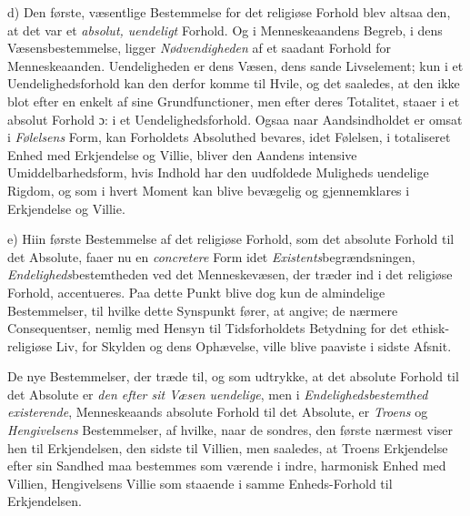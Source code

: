 d) Den første, væsentlige Bestemmelse for det religiøse Forhold blev altsaa
den, at det var et \emph{absolut, uendeligt} Forhold. Og i Menneskeaandens
Begreb, i dens Væsensbestemmelse, ligger \emph{Nødvendigheden} af et saadant
Forhold for Menneskeaanden. Uendeligheden er dens Væsen, dens sande
Livselement; kun i et Uendelighedsforhold kan den derfor komme til Hvile, og
det saaledes, at den ikke blot efter en enkelt af sine Grundfunctioner, men
efter deres Totalitet, staaer i et absolut Forhold ɔ: i et
Uendelighedsforhold. Ogsaa naar Aandsindholdet er omsat i \emph{Følelsens}
Form, kan Forholdets Absoluthed bevares, idet Følelsen, i totaliseret Enhed
med Erkjendelse og Villie, bliver den Aandens intensive Umiddelbarhedsform,
hvis Indhold har den uudfoldede Muligheds uendelige Rigdom, og som i hvert
 Moment kan blive bevægelig og gjennemklares i Erkjendelse og Villie.

e) Hiin første Bestemmelse af det religiøse Forhold, som det absolute Forhold
til det Absolute, faaer nu en \emph{concretere} Form idet
\emph{Existents}begrændsningen, \emph{Endeligheds}bestemtheden ved det
Menneskevæsen, der træder ind i det religiøse Forhold, accentueres. Paa dette
Punkt blive dog kun de almindelige Bestemmelser, til hvilke dette Synspunkt
fører, at angive; de nærmere Consequentser, nemlig med Hensyn til
Tidsforholdets Betydning for det ethisk-religiøse Liv, for Skylden og dens
Ophævelse, ville blive paaviste i sidste Afsnit.

De nye Bestemmelser, der træde til, og som udtrykke, at det absolute Forhold
til det Absolute er \emph{den efter sit Væsen uendelige}, men i
\emph{Endelighedsbestemthed existerende}, Menneskeaands absolute Forhold til
det Absolute, er \emph{Troens} og \emph{Hengivelsens} Bestemmelser, af hvilke,
naar de sondres, den første nærmest viser hen til Erkjendelsen, den sidste til
Villien, men saaledes, at Troens Erkjendelse efter sin Sandhed maa bestemmes
som værende i indre, harmonisk Enhed med Villien, Hengivelsens Villie som
staaende i samme Enheds-Forhold til Erkjendelsen.

